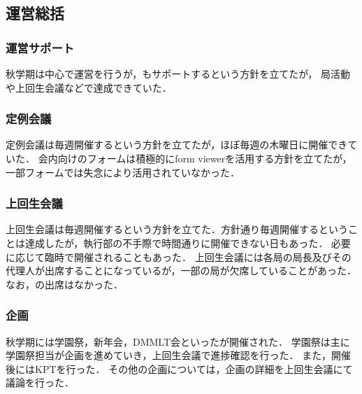 \subsection*{運営総括}


\subsubsection*{運営サポート}
秋学期は\secondGrade{}中心で運営を行うが，\thirdGrade{}もサポートするという方針を立てたが，
局活動や上回生会議などで達成できていた．

\subsubsection{定例会議}
定例会議は毎週開催するという方針を立てたが，ほぼ毎週の木曜日に開催できていた．
会内向けのフォームは積極的にform viewerを活用する方針を立てたが，一部フォームでは失念により活用されていなかった．

\subsubsection{上回生会議}
上回生会議は毎週開催するという方針を立てた．方針通り毎週開催するということは達成したが，執行部の不手際で時間通りに開催できない日もあった．
必要に応じて臨時で開催されることもあった．
上回生会議には各局の局長及びその代理人が出席することになっているが，一部の局が欠席していることがあった．
なお，\firstGrade{}の出席はなかった．

\subsubsection{企画}
秋学期には学園祭，新年会，DMMLT会といったが開催された．
学園祭は主に学園祭担当が企画を進めていき，上回生会議で進捗確認を行った．
また，開催後にはKPTを行った．
その他の企画については，企画の詳細を上回生会議にて議論を行った．
